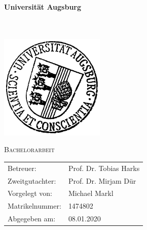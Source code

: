
\thispagestyle{empty}
\newcommand{\Universitat}{Universität Augsburg}
\begin{titlepage}
  	\begin{center}
		\LARGE \textbf{\Universitat} \\
		\uni \\
		\text{\lehrstuhl} \\
	\end{center}
	\vspace*{1em}
	\begin{center}
		\includegraphics[width=5cm,height=5cm]{UNI}
	\end{center}
	
	\vspace*{1em}
	
	\begin{center}
		\Huge\textsc{Bachelorarbeit}
	\end{center}
	
	\vspace*{1cm}
	\ownline
	\begin{center}
	\end{center}
	\ownline
    \vfill
    {\setlength{\tabcolsep}{12pt}
   	\centering
	\begin{tabular}{ll}
		Betreuer: & Prof. Dr. Tobias Harks\\
		Zweitgutachter: & Prof. Dr. Mirjam Dür\\[1em]
		Vorgelegt von: & Michael Markl\\
		Matrikelnummer: & 1474802\\
		Abgegeben am: & 08.01.2020
	\end{tabular}\par
	}
\end{titlepage}
